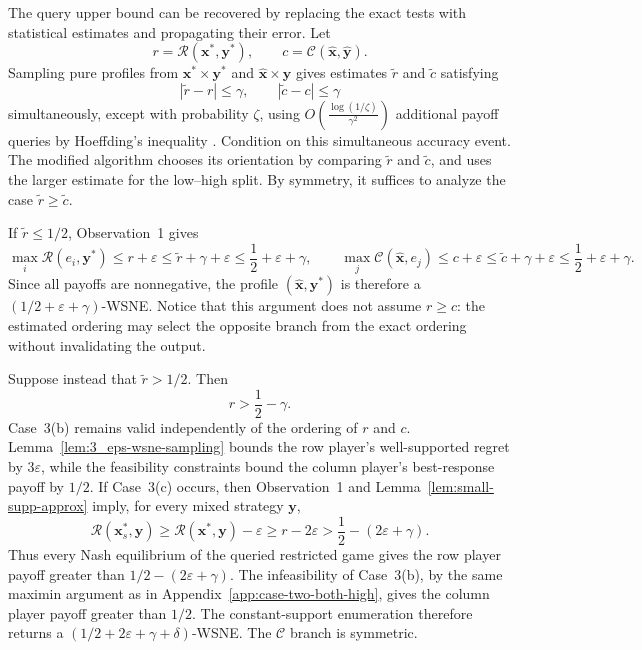 The query upper bound can be recovered by replacing the exact tests with statistical estimates and propagating their error. Let
\[
  r=\mathcal{R}(\mathbf{x}^*,\mathbf{y}^*),
  \qquad
  c=\mathcal{C}(\hat{\mathbf{x}},\hat{\mathbf{y}}).
\]
Sampling pure profiles from \(\mathbf{x}^*\times\mathbf{y}^*\) and \(\hat{\mathbf{x}}\times\hat{\mathbf{y}}\) gives estimates \(\widetilde r\) and \(\widetilde c\) satisfying
\[
  |\widetilde r-r|\leq\gamma,
  \qquad
  |\widetilde c-c|\leq\gamma
\]
simultaneously, except with probability \(\zeta\), using \(O\left(\frac{\log(1 / \zeta)}{\gamma^2}\right)\) additional payoff queries by Hoeffding's inequality \cite{hoeffding63}. Condition on this simultaneous accuracy event. The modified algorithm chooses its orientation by comparing \(\widetilde r\) and \(\widetilde c\), and uses the larger estimate for the low--high split. By symmetry, it suffices to analyze the case \(\widetilde r\geq\widetilde c\).

If \(\widetilde r\leq 1/2\), Observation~1 gives
\[
  \max_i\mathcal{R}(e_i,\mathbf{y}^*)
  \leq r+\varepsilon
  \leq \widetilde r+\gamma+\varepsilon
  \leq \frac12+\varepsilon+\gamma,
  \qquad
  \max_j\mathcal{C}(\hat{\mathbf{x}},e_j)
  \leq c+\varepsilon
  \leq \widetilde c+\gamma+\varepsilon
  \leq \frac12+\varepsilon+\gamma.
\]
Since all payoffs are nonnegative, the profile \((\hat{\mathbf{x}},\mathbf{y}^*)\) is therefore a \((1/2+\varepsilon+\gamma)\)-WSNE. Notice that this argument does not assume \(r\geq c\): the estimated ordering may select the opposite branch from the exact ordering without invalidating the output.

Suppose instead that \(\widetilde r>1/2\). Then
\[
  r>\frac12-\gamma.
\]
Case~3(b) remains valid independently of the ordering of \(r\) and \(c\). Lemma~\ref{lem:3_eps-wsne-sampling} bounds the row player's well-supported regret by \(3\varepsilon\), while the feasibility constraints bound the column player's best-response payoff by \(1/2\). If Case~3(c) occurs, then Observation~1 and Lemma~\ref{lem:small-supp-approx} imply, for every mixed strategy \(\mathbf{y}\),
\[
  \mathcal{R}(\mathbf{x}_s^*,\mathbf{y})
  \geq \mathcal{R}(\mathbf{x}^*,\mathbf{y})-\varepsilon
  \geq r-2\varepsilon
  >\frac12-(2\varepsilon+\gamma).
\]
Thus every Nash equilibrium of the queried restricted game gives the row player payoff greater than \(1/2-(2\varepsilon+\gamma)\). The infeasibility of Case~3(b), by the same maximin argument as in Appendix~\ref{app:case-two-both-high}, gives the column player payoff greater than \(1/2\). The constant-support enumeration therefore returns a \((1/2+2\varepsilon+\gamma+\delta)\)-WSNE. The \(\mathcal{C}\) branch is symmetric.

